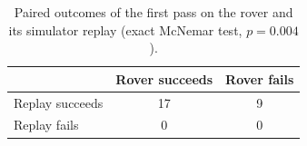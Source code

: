 \begin{table}[htbp]
\centering
\caption{Paired outcomes of the first pass on the rover and its simulator replay (exact McNemar test, $p = 0.004$).}
\label{tab:rdt_mcnemar}
\small
\begin{tabular}{lcc}
\toprule
 & Rover succeeds & Rover fails \\
\midrule
Replay succeeds & 17 & 9 \\
Replay fails & 0 & 0 \\
\bottomrule
\end{tabular}
\end{table}
